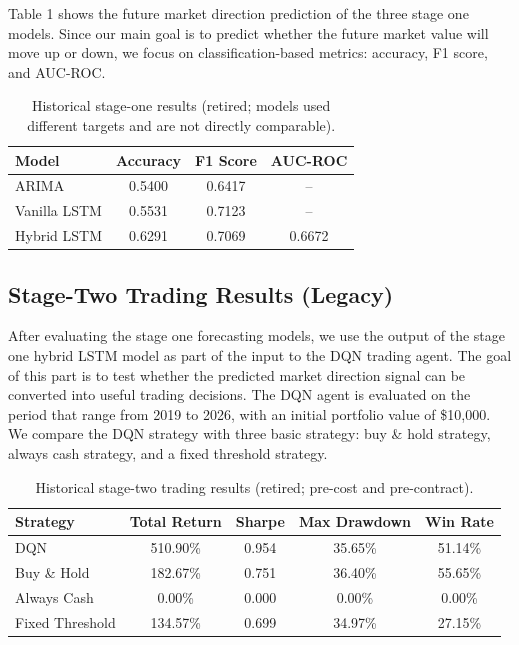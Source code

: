 \documentclass{article}
\begin{document}
Table 1 shows the future market direction prediction of the three stage one models. Since our main goal is to predict whether the future market value will move up or down, we focus on classification-based metrics: accuracy, F1 score, and AUC-ROC.

\begin{table}[H]
\centering
\small
\caption{Historical stage-one results (retired; models used different targets and are not directly comparable).}
\label{tab:stage1_results}
\begin{tabular}{lccc}
\toprule
\textbf{Model} & \textbf{Accuracy} & \textbf{F1 Score} & \textbf{AUC-ROC} \\
\midrule
ARIMA & 0.5400 & 0.6417 & -- \\
Vanilla LSTM & 0.5531 & 0.7123 & -- \\
Hybrid LSTM & 0.6291 & 0.7069 & 0.6672 \\
\bottomrule
\end{tabular}
\end{table}

\subsection{Stage-Two Trading Results (Legacy)}

After evaluating the stage one forecasting models, we use the output of the stage one hybrid LSTM model as part of the input to the DQN trading agent. The goal of this part is to test whether the predicted market direction signal can be converted into useful trading decisions. The DQN agent is evaluated on the period that range from 2019 to 2026, with an initial portfolio value of \$10,000. We compare the DQN strategy with three basic strategy: buy \& hold strategy, always cash strategy, and a fixed threshold strategy.

\begin{table}[H]
\centering
\small
\caption{Historical stage-two trading results (retired; pre-cost and pre-contract).}
\label{tab:dqn_results}
\begin{tabular}{lcccc}
\toprule
\textbf{Strategy} & \textbf{Total Return} & \textbf{Sharpe} & \textbf{Max Drawdown} & \textbf{Win Rate} \\
\midrule
DQN & 510.90\% & 0.954 & 35.65\% & 51.14\% \\
Buy \& Hold & 182.67\% & 0.751 & 36.40\% & 55.65\% \\
Always Cash & 0.00\% & 0.000 & 0.00\% & 0.00\% \\
Fixed Threshold & 134.57\% & 0.699 & 34.97\% & 27.15\% \\
\bottomrule
\end{tabular}
\end{table}
\end{document}
